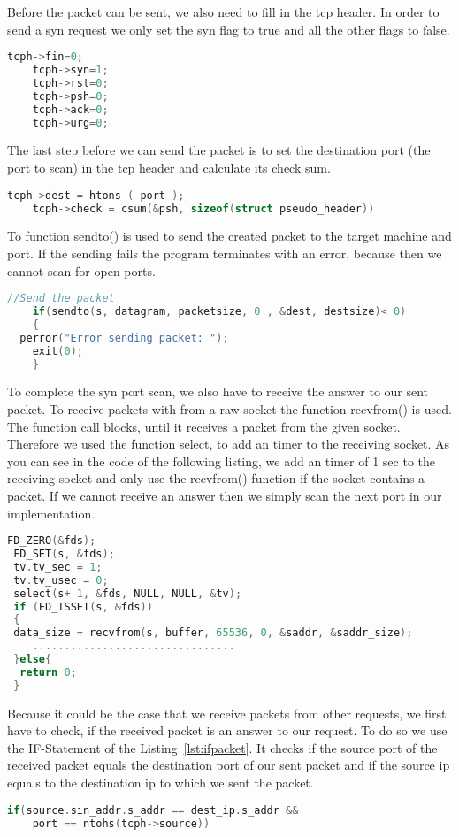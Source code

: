 \documentclass[a4paper]{scrartcl}
\begin{document}
	Before the packet can be sent, we also need to fill in the tcp header. In order to send a syn request we only set the syn flag to true and all the other flags to false.
	\begin{lstlisting}[frame= single, language=C, caption= C code to set flags in tcp header]
	tcph->fin=0;
	tcph->syn=1;
	tcph->rst=0;
	tcph->psh=0;
	tcph->ack=0;
	tcph->urg=0;
	\end{lstlisting}
	The last step before we can send the packet is to set the destination port (the port to scan)  in the tcp header and calculate its check sum.
	\begin{lstlisting}[frame= single, language=C, caption= C code to set port and calculate checksum in tcp header]
	tcph->dest = htons ( port );
	tcph->check = csum(&psh, sizeof(struct pseudo_header))
	\end{lstlisting}
	To function sendto() is used to send the created packet to the target machine and port. If the sending fails the program terminates with
	an error, because then we cannot scan for open ports.
	\begin{lstlisting}[frame= single, language=C, caption= C code to set port and calculate checksum in tcp header]
	//Send the packet
	if(sendto(s, datagram, packetsize, 0 , &dest, destsize)< 0)
	{
  perror("Error sending packet: ");
	exit(0);
	}
	\end{lstlisting}
	To complete the syn port scan, we also have to receive the answer to our sent packet. To receive packets with from a raw socket the function recvfrom() is used. The function call blocks, until it
	receives a packet from the given socket. Therefore we used the function select, to add an timer to the receiving socket. As you can see in the code of the following listing, we add an timer of 1 sec
	to the receiving socket and only use the recvfrom() function if the socket contains a packet. If we cannot receive an answer then we simply scan the next port in our implementation.
	\begin{lstlisting}[frame= single, language=C, caption= C code to receive the packet]
 FD_ZERO(&fds);
 FD_SET(s, &fds);
 tv.tv_sec = 1;
 tv.tv_usec = 0;
 select(s+ 1, &fds, NULL, NULL, &tv);		
 if (FD_ISSET(s, &fds))
 {
 data_size = recvfrom(s, buffer, 65536, 0, &saddr, &saddr_size);
	................................
 }else{
  return 0;
 }
	\end{lstlisting}
	Because it could be the case that we receive packets from other requests, we first have to check, if the received packet
	is an answer to our request. To do so we use the IF-Statement of the Listing~\ref{lst:ifpacket}. It checks if the source port of the received packet equals the destination port of our sent packet and
	if the source ip equals to the destination ip to which we sent the packet.
	\begin{lstlisting}[frame= single, language=C, caption= IF statement to check origin of packet, label=lst:ifpacket]
	if(source.sin_addr.s_addr == dest_ip.s_addr &&
	port == ntohs(tcph->source))
	\end{lstlisting}
\end{document}
